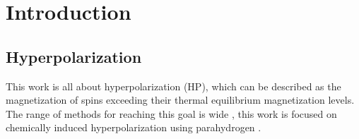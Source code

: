 \chapter{Introduction}
\label{chap:introduction}
    \section{Hyperpolarization}
    This work is all about hyperpolarization (HP), which can be described as the magnetization of spins exceeding their thermal equilibrium magnetization levels. The range of methods for reaching this goal is wide \cite{johannesson_dynamic_2009,hirsch_brute-force_2015,duhamel_xenon-129_2001,fain_imaging_2010, bowers_parahydrogen_1987-2, adams_reversible_2009-2}, this work is focused on chemically induced hyperpolarization using parahydrogen \cite{green_theory_2012-1}.
